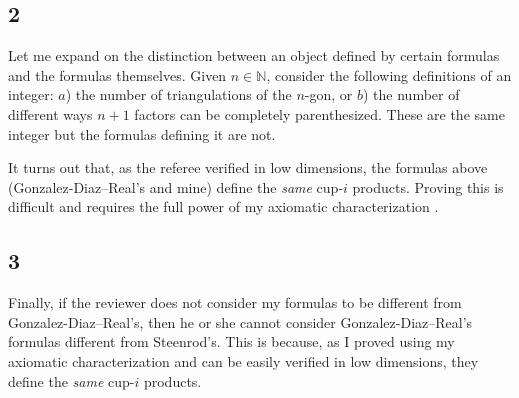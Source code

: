 \documentclass{amsart}
\begin{document}
	\subsection*{2} Let me expand on the distinction between an object defined by certain formulas and the formulas themselves.
	Given $n \in \mathbb N$, consider the following definitions of an integer: $a$) the number of triangulations of the $n$-gon, or $b$) the number of different ways $n+1$ factors can be completely parenthesized.
	These are the same integer but the formulas defining it are not.

	It turns out that, as the referee verified in low dimensions, the formulas above (Gonzalez-Diaz--Real's and mine) define the \textit{same} cup-$i$ products.
	Proving this is difficult and requires the full power of my axiomatic characterization \cite{medina2022axiomatic}.

	\subsection*{3} Finally, if the reviewer does not consider my formulas to be different from Gonzalez-Diaz--Real's, then he or she cannot consider Gonzalez-Diaz--Real's formulas different from Steenrod's.
	This is because, as I proved using my axiomatic characterization and can be easily verified in low dimensions, they define the \textit{same} cup-$i$ products.

	\sloppy
	\printbibliography
\end{document}
